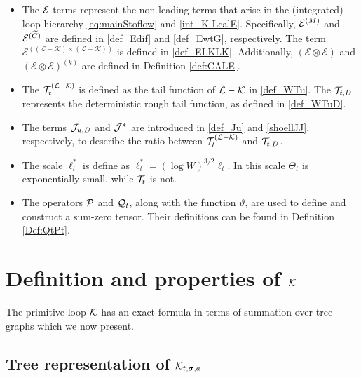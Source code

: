 \documentclass[10pt,reqno]{article}
\theoremstyle{plain} %
\theoremstyle{remark}
\numberwithin{equation}{section}
\begin{document}
\begin{itemize}
\item  The \(\cal E\) terms represent the non-leading terms that arise in the (integrated) loop hierarchy \eqref{eq:mainStoflow} and \eqref{int_K-LcalE}. Specifically, \({\cal E}^{(M)}\) and \({\cal E}^{(\widetilde{G})}\) are defined in \eqref{def_Edif} and \eqref{def_EwtG}, respectively. The term \(\mathcal{E}^{((\mathcal{L}-\mathcal{K}) \times (\mathcal{L}-\mathcal{K}))}\) is defined in \eqref{def_ELKLK}. Additionally, \(\left( \mathcal{E} \otimes \mathcal{E} \right)\) and \(\left( \mathcal{E} \otimes \mathcal{E} \right)^{(k)}\) are defined in Definition \ref{def:CALE}.

\item  The \({\cal T}^{(\cal L-\cal K)}_{t}\) is defined as the tail function of \(\cal L - \cal K\) in \eqref{def_WTu}. The \({\cal T}_{t,D}\) represents the deterministic rough tail function, as defined in \eqref{def_WTuD}. 
\item The terms \({\cal J}_{u,D}\) and \(\cal J^*\) are introduced in \eqref{def_Ju} and \eqref{shoellJJ}, respectively, to describe the ratio between \({\cal T}^{(\cal L-\cal K)}_{t}\) and \({\cal T}_{t,D}\).

\item The scale $\ell_t^*$ is define as $\ell_t^*=(\log W)^{3/2}\ell_t$. In this scale $\Theta_t$ is exponentially small, while ${\cal T}_t$ is not. 

\item The operators \(\cal P\) and \({\cal Q}_t\), along with the function \(\vartheta\), are used to define and construct a sum-zero tensor. Their definitions can be found in Definition \ref{Def:QtPt}.
 

\end{itemize}



\section{Definition and properties of \texorpdfstring{$\cal K$}{K}}\label{Sec:CalK}

The primitive loop ${\cal K}$ has an exact formula in terms of summation over tree graphs which we now present. 

\subsection{Tree representation of \texorpdfstring{${\cal K}_{t, \boldsymbol{\sigma}, \textbf{a}}$}{K}}
\end{document}
